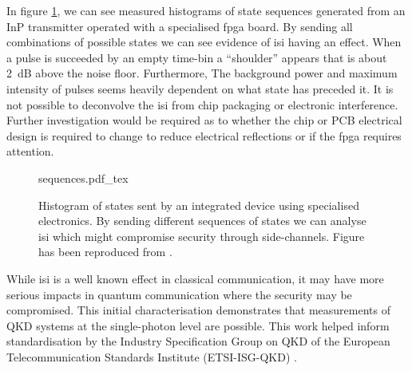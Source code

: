 
In figure \ref{fig:npl_states}, we can see measured histograms of state sequences generated from an \ac{InP} transmitter operated with a specialised \ac{fpga} board. By sending all combinations of possible states we can see evidence of \ac{isi} having an effect. When a pulse is succeeded by an empty time-bin a ``shoulder'' appears that is about \SI{2}{dB} above the noise floor. Furthermore, The background power and maximum intensity of pulses seems heavily dependent on what state has preceded it. It is not possible to deconvolve the \ac{isi} from chip packaging or electronic interference. Further investigation would be required as to whether the chip or PCB electrical design is required to change to reduce electrical reflections or if the \ac{fpga} requires attention.


\begin{figure}[t]
	\centering
	\tiny
	\def\svgwidth{\textwidth} 
	{sequences.pdf_tex}
	\caption[Security analysis of transmitters driven by specialised electronics]{Histogram of states sent by an integrated device using specialised electronics. By sending different sequences of states we can analyse \ac{isi} which might compromise security through side-channels. Figure has been reproduced from \cite{vaquero2018}.}
	\label{fig:npl_states}
\end{figure}

While \ac{isi} is a well known effect in classical communication, it may have more serious impacts in quantum communication where the security may be compromised. This initial characterisation demonstrates that measurements of \ac{QKD} systems at the single-photon level are possible. This work helped inform standardisation by the Industry Specification Group on QKD of the European Telecommunication Standards Institute (ETSI-ISG-QKD) \cite{ETSI}.

